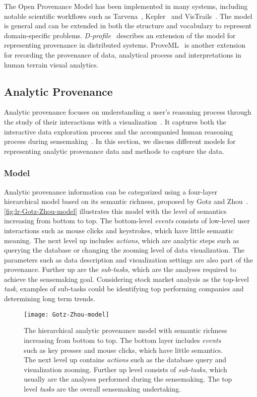 The Open Provenance Model has been implemented in many systems, including notable scientific workflows such as Tarvena~\cite{Zhao2008}, Kepler~\cite{Bowers2006} and VisTrails~\cite{Bavoil2005}. The model is general and can be extended in both the structure and vocabulary to represent domain-specific problems. \emph{D-profile}~\cite{Groth2011} describes an extension of the model for representing provenance in distributed systems. ProveML~\cite{Walker2013} is another extension for recording the provenance of data, analytical process and interpretations in human terrain visual analytics.

\subsection{Analytic Provenance}
Analytic provenance focuses on understanding a user's reasoning process through the study of their interactions with a visualization~\cite{North2011}. It captures both the interactive data exploration process and the accompanied human reasoning process during sensemaking~\cite{Xu2015}. In this section, we discuss different models for representing analytic provenance data and methods to capture the data.

\subsubsection{Model}
Analytic provenance information can be categorized using a four-layer hierarchical model based on its semantic richness, proposed by Gotz and Zhou~\cite{Gotz2009}. \autoref{fig:lr-Gotz-Zhou-model} illustrates this model with the level of semantics increasing from bottom to top. The bottom-level \emph{events} consists of low-level user interactions such as mouse clicks and keystrokes, which have little semantic meaning. The next level up includes \emph{actions}, which are analytic steps such as querying the database or changing the zooming level of data visualization. The parameters such as data description and visualization settings are also part of the provenance. Further up are the \emph{sub-tasks}, which are the analyses required to achieve the sensemaking goal. Considering stock market analysis as the top-level \emph{task}, examples of sub-tasks could be identifying top performing companies and determining long term trends. 

\begin{figure}[!htb]
	\centering
	\texttt{[image: Gotz-Zhou-model]}
	\caption{The hierarchical analytic provenance model with semantic richness increasing from bottom to top. The bottom layer includes \emph{events} such as key presses and mouse clicks, which have little semantics. The next level up contains \emph{actions} such as the database query and visualization zooming. Further up level consists of \emph{sub-tasks}, which usually are the analyses performed during the sensemaking. The top level \emph{tasks} are the overall sensemaking undertaking. }
	\label{fig:lr-Gotz-Zhou-model}
\end{figure}

